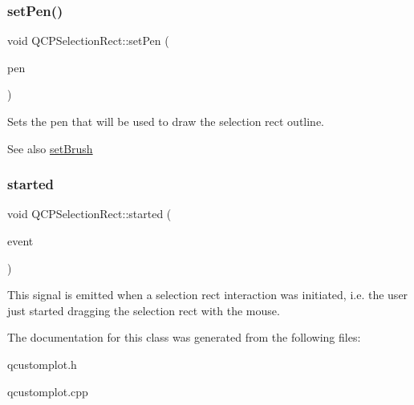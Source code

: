 \subsubsection{\texorpdfstring{set\+Pen()}{setPen()}}
{\footnotesize\ttfamily void Q\+C\+P\+Selection\+Rect\+::set\+Pen (\begin{DoxyParamCaption}\item[{const Q\+Pen \&}]{pen }\end{DoxyParamCaption})}

Sets the pen that will be used to draw the selection rect outline.

\begin{DoxySeeAlso}{See also}
\hyperlink{classQCPSelectionRect_ab0c66f1484418782efa01f4153611080}{set\+Brush} 
\end{DoxySeeAlso}
\mbox{\label{classQCPSelectionRect_a7b7162d19f4f2174d3644ff1a5d335aa}} 
\subsubsection{\texorpdfstring{started}{started}}
{\footnotesize\ttfamily void Q\+C\+P\+Selection\+Rect\+::started (\begin{DoxyParamCaption}\item[{Q\+Mouse\+Event $\ast$}]{event }\end{DoxyParamCaption})\hspace{0.3cm}{\ttfamily [signal]}}

This signal is emitted when a selection rect interaction was initiated, i.\+e. the user just started dragging the selection rect with the mouse. 

The documentation for this class was generated from the following files\+:\begin{DoxyCompactItemize}
\item 
qcustomplot.\+h\item 
qcustomplot.\+cpp\end{DoxyCompactItemize}

